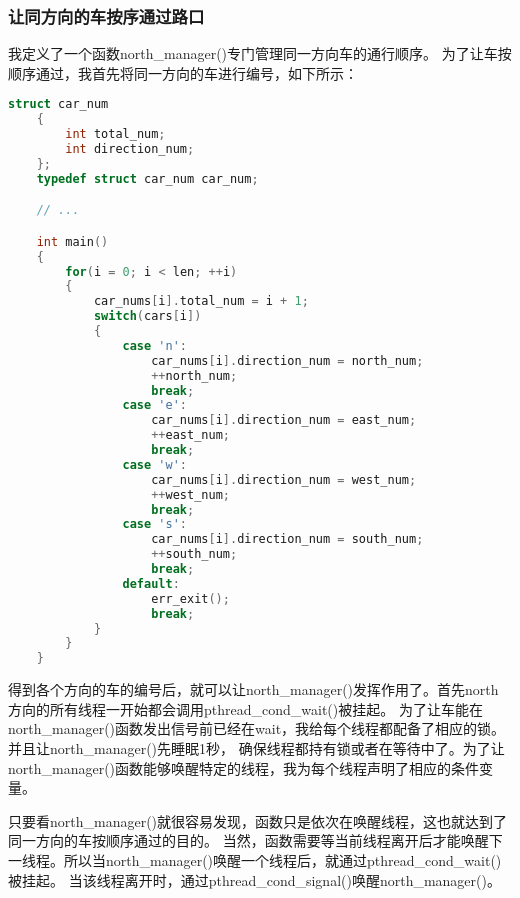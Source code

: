 \documentclass[a4paper,left=2.5cm,right=2.5cm,11pt]{article}
\begin{document}
\subsubsection{让同方向的车按序通过路口}
	我定义了一个函数north\_manager()专门管理同一方向车的通行顺序。
	为了让车按顺序通过，我首先将同一方向的车进行编号，如下所示：
	\begin{lstlisting}[language = C]
	struct car_num
	{
		int total_num;
		int direction_num;
	};
	typedef struct car_num car_num;

	// ...

	int main()
	{
		for(i = 0; i < len; ++i)
		{
			car_nums[i].total_num = i + 1;
			switch(cars[i])
			{
				case 'n':
					car_nums[i].direction_num = north_num;
					++north_num;
					break;
				case 'e':
					car_nums[i].direction_num = east_num;
					++east_num;
					break;
				case 'w':
					car_nums[i].direction_num = west_num;
					++west_num;
					break;
				case 's':
					car_nums[i].direction_num = south_num;
					++south_num;
					break;
				default:
					err_exit();
					break;
			}
		}
	}
	\end{lstlisting}

	得到各个方向的车的编号后，就可以让north\_manager()发挥作用了。首先north方向的所有线程一开始都会调用pthread\_cond\_wait()被挂起。
	为了让车能在north\_manager()函数发出信号前已经在wait，我给每个线程都配备了相应的锁。并且让north\_manager()先睡眠1秒，
	确保线程都持有锁或者在等待中了。为了让north\_manager()函数能够唤醒特定的线程，我为每个线程声明了相应的条件变量。 \par
	只要看north\_manager()就很容易发现，函数只是依次在唤醒线程，这也就达到了同一方向的车按顺序通过的目的。
	当然，函数需要等当前线程离开后才能唤醒下一线程。所以当north\_manager()唤醒一个线程后，就通过pthread\_cond\_wait()被挂起。
	当该线程离开时，通过pthread\_cond\_signal()唤醒north\_manager()。
\end{document}

